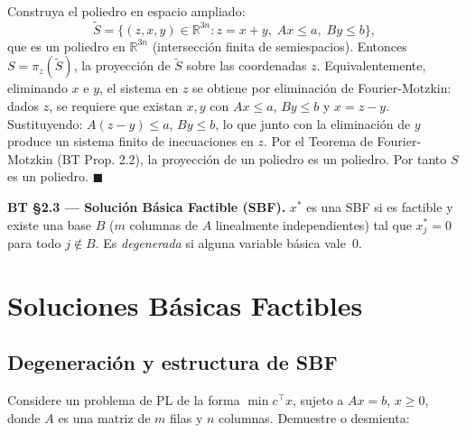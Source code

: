 \documentclass[12pt]{article}
\theoremstyle{plain}
\begin{document}
\begin{solucion}

Construya el poliedro en espacio ampliado:
\[
\tilde{S} = \{(z,x,y) \in \mathbb{R}^{3n} : z = x+y,\; Ax \leq a,\; By \leq b\},
\]
que es un poliedro en $\mathbb{R}^{3n}$ (intersección finita de semiespacios). Entonces $S = \pi_z(\tilde{S})$, la proyección de $\tilde{S}$ sobre las coordenadas $z$. Equivalentemente, eliminando $x$ e $y$, el sistema en $z$ se obtiene por eliminación de Fourier-Motzkin: dados $z$, se requiere que existan $x,y$ con $Ax \leq a$, $By \leq b$ y $x = z - y$. Sustituyendo: $A(z-y) \leq a$, $By \leq b$, lo que junto con la eliminación de $y$ produce un sistema finito de inecuaciones en $z$. Por el Teorema de Fourier-Motzkin (BT Prop. 2.2), la proyección de un poliedro es un poliedro. Por tanto $S$ es un poliedro. $\blacksquare$

\end{solucion}

\begin{teofund}\textbf{BT §2.3 — Solución Básica Factible (SBF).} $x^*$ es una SBF si es factible y existe una base $B$ ($m$ columnas de $A$ linealmente independientes) tal que $x^*_j=0$ para todo $j\notin B$. Es \emph{degenerada} si alguna variable básica vale~0.\end{teofund}

\bigskip

\section{Soluciones Básicas Factibles}

\subsection{Degeneración y estructura de SBF}

Considere un problema de PL de la forma $\min c^{\top}x$, sujeto a $Ax = b$, $x \geq 0$,
donde $A$ es una matriz de $m$ filas y $n$ columnas. Demuestre o desmienta:
\end{document}
